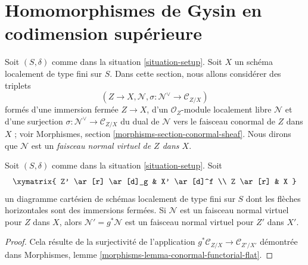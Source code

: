 \section{Homomorphismes de Gysin en codimension supérieure}
\label{section-gysin-higher-codimension}

\noindent
Soit $(S, \delta)$ comme dans la situation \ref{situation-setup}. Soit $X$ un schéma
localement de type fini sur $S$. Dans cette section, nous allons considérer des
triplets
$$
(Z \to X, \mathcal{N}, \sigma : \mathcal{N}^\vee \to \mathcal{C}_{Z/X})
$$
formés d'une immersion fermée $Z \to X$, d'un
$\mathcal{O}_Z$-module localement libre $\mathcal{N}$ et d'une surjection
$\sigma : \mathcal{N}^\vee \to \mathcal{C}_{Z/X}$ du dual
de $\mathcal{N}$ vers le faisceau conormal de $Z$ dans $X$ ; voir
Morphismes, section \ref{morphisms-section-conormal-sheaf}.
Nous dirons que
$\mathcal{N}$ est un {\it faisceau normal virtuel de $Z$ dans $X$}.

\begin{lemma}
\label{lemma-pullback-virtual-normal-sheaf}
Soit $(S, \delta)$ comme dans la situation \ref{situation-setup}. Soit
$$
\xymatrix{
Z' \ar[r] \ar[d]_g & X' \ar[d]^f \\
Z \ar[r] & X
}
$$
un diagramme cartésien de schémas localement de type fini sur $S$
dont les flèches horizontales sont des immersions fermées.
Si $\mathcal{N}$ est un faisceau normal virtuel pour $Z$ dans $X$, alors
$\mathcal{N}' = g^*\mathcal{N}$ est un faisceau normal virtuel pour
$Z'$ dans $X'$.
\end{lemma}

\begin{proof}
Cela résulte de la surjectivité de l'application
$g^*\mathcal{C}_{Z/X} \to \mathcal{C}_{Z'/X'}$ démontrée dans
Morphismes, lemme \ref{morphisms-lemma-conormal-functorial-flat}.
\end{proof}

